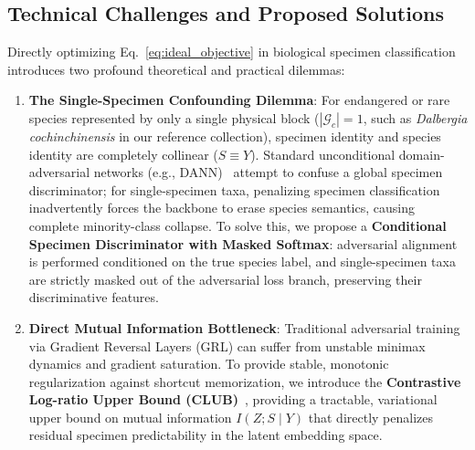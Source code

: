 \documentclass[a4paper,fleqn]{cas-sc}
\begin{document}
\subsection{Technical Challenges and Proposed Solutions}
Directly optimizing Eq.~\eqref{eq:ideal_objective} in biological specimen classification introduces two profound theoretical and practical dilemmas:
\begin{enumerate}
    \item \textbf{The Single-Specimen Confounding Dilemma}: For endangered or rare species represented by only a single physical block ($|\mathcal{G}_c| = 1$, such as \textit{Dalbergia cochinchinensis} in our reference collection), specimen identity and species identity are completely collinear ($S \equiv Y$). Standard unconditional domain-adversarial networks (e.g., DANN)~\cite{ganin2015dann} attempt to confuse a global specimen discriminator; for single-specimen taxa, penalizing specimen classification inadvertently forces the backbone to erase species semantics, causing complete minority-class collapse. To solve this, we propose a \textbf{Conditional Specimen Discriminator with Masked Softmax}: adversarial alignment is performed conditioned on the true species label, and single-specimen taxa are strictly masked out of the adversarial loss branch, preserving their discriminative features.
    \item \textbf{Direct Mutual Information Bottleneck}: Traditional adversarial training via Gradient Reversal Layers (GRL) can suffer from unstable minimax dynamics and gradient saturation. To provide stable, monotonic regularization against shortcut memorization, we introduce the \textbf{Contrastive Log-ratio Upper Bound (CLUB)}~\cite{cheng2020club}, providing a tractable, variational upper bound on mutual information $I(Z; S \mid Y)$ that directly penalizes residual specimen predictability in the latent embedding space.
\end{enumerate}
\end{document}
